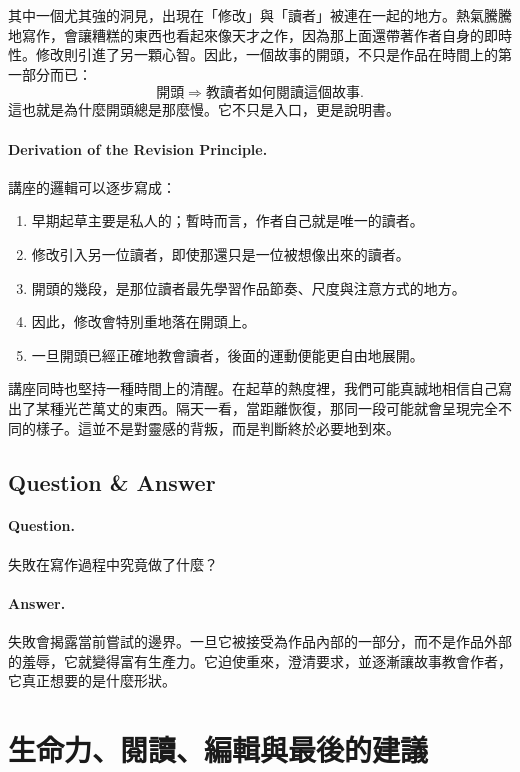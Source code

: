 其中一個尤其強的洞見，出現在「修改」與「讀者」被連在一起的地方。熱氣騰騰地寫作，會讓糟糕的東西也看起來像天才之作，因為那上面還帶著作者自身的即時性。修改則引進了另一顆心智。因此，一個故事的開頭，不只是作品在時間上的第一部分而已：
\begin{equation}
\text{開頭} \Rightarrow \text{教讀者如何閱讀這個故事}.
\end{equation}
這也就是為什麼開頭總是那麼慢。它不只是入口，更是說明書。

\paragraph{Derivation of the Revision Principle.} 講座的邏輯可以逐步寫成：
\begin{enumerate}
\item 早期起草主要是私人的；暫時而言，作者自己就是唯一的讀者。
\item 修改引入另一位讀者，即使那還只是一位被想像出來的讀者。
\item 開頭的幾段，是那位讀者最先學習作品節奏、尺度與注意方式的地方。
\item 因此，修改會特別重地落在開頭上。
\item 一旦開頭已經正確地教會讀者，後面的運動便能更自由地展開。
\end{enumerate}

講座同時也堅持一種時間上的清醒。在起草的熱度裡，我們可能真誠地相信自己寫出了某種光芒萬丈的東西。隔天一看，當距離恢復，那同一段可能就會呈現完全不同的樣子。這並不是對靈感的背叛，而是判斷終於必要地到來。

\subsection{Question \& Answer}

\paragraph{Question.} 失敗在寫作過程中究竟做了什麼？

\paragraph{Answer.} 失敗會揭露當前嘗試的邊界。一旦它被接受為作品內部的一部分，而不是作品外部的羞辱，它就變得富有生產力。它迫使重來，澄清要求，並逐漸讓故事教會作者，它真正想要的是什麼形狀。

\section{生命力、閱讀、編輯與最後的建議}

